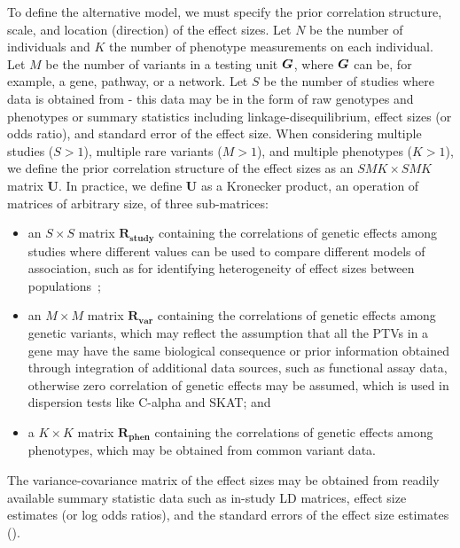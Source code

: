 To define the alternative model, we must specify the prior correlation structure, scale, and location (direction) of the effect sizes. Let $N$ be the number of individuals and $K$ the number of phenotype measurements on each individual. Let $M$ be the number of variants in a testing unit ${\boldsymbol G}$, where ${\boldsymbol G}$ can be, for example, a gene, pathway, or a network. Let $S$ be the number of studies where data is obtained from - this data may be in the form of raw genotypes and phenotypes or summary statistics including linkage-disequilibrium, effect sizes (or odds ratio), and standard error of the effect size. When considering multiple studies ($S > 1$), multiple rare variants ($M > 1$), and multiple phenotypes ($K > 1$), we define the prior correlation structure of the effect sizes as an $SMK\times SMK$ matrix $\mathbf{U}$. In practice, we define $\mathbf{U}$ as a Kronecker product, an operation of matrices of arbitrary size, of three sub-matrices:
\begin{itemize}
\item an $S\times S$ matrix $\mathbf{R_{\textrm{study}}}$ containing the correlations of genetic effects among studies where different values can be used to compare different models of association, such as for identifying heterogeneity of effect sizes between populations~\cite{band2013imputation};
\item an $M\times M$ matrix $\mathbf{R_{\textrm{var}}}$ containing the correlations of genetic effects among genetic variants, which may reflect the assumption that all the PTVs in a gene may have the same biological consequence\cite{macarthur,rivas2013assessing,rivas2015effect} or prior information obtained through integration of additional data sources, such as functional assay data\cite{majithia2014rare,findlay2014saturation}, otherwise zero correlation of genetic effects may be assumed, which is used in dispersion tests like C-alpha\cite{calpha,clarke2013flexible} and SKAT\cite{skat}; and
\item a $K\times K$ matrix $\mathbf{R_{\textrm{phen}}}$ containing the correlations of genetic effects among phenotypes, which may be obtained from common variant data\cite{cotsapas2011pervasive,solovieff2013pleiotropy,gencorr2015}.
\end{itemize}
The variance-covariance matrix of the effect sizes may be obtained from readily available summary statistic data such as in-study LD matrices, effect size estimates (or log odds ratios), and the standard errors of the effect size estimates ().

